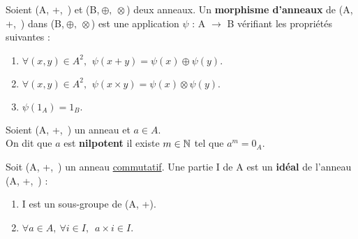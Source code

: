 Soient (A, +,\ \x) et (B,\(\ \oplus ,\ \otimes \)) deux anneaux. Un \textbf{morphisme d'anneaux} de (A, +,\ \x) dans (B,\(\ \oplus ,\ \otimes \)) est une application \(\psi\) : A \(\to\) B vérifiant les propriétés suivantes :\vspace{-0.1cm}
\begin{enumerate}[leftmargin=2cm]
    \item \(\forall(x,y)\in A^2,\ \, \psi(x+y)=\psi(x)\oplus \psi(y). \)\vspace{0.1cm}

    \item \(\forall(x,y)\in A^2,\ \,\psi(x\times y)=\psi(x)\otimes \psi(y). \)\vspace{0.1cm}

    \item \(\psi(1_A)=1_B. \)
\end{enumerate}


\vspace{1cm}

Soient (A, +,\, \x) un anneau et \(a\in A\).\\
On dit que $a$ est \textbf{nilpotent} \ssi il existe $m\in \mathbb{N}$\expo{*} tel que \(a^m=0_A\).

\vspace{1cm}

Soit (A, +,\ \x) un anneau \underline{commutatif}. Une partie I de A est un \textbf{idéal} de l'anneau (A, +,\ \x) \ssi :\vspace{-0.1cm}
\begin{enumerate}[leftmargin=2cm]
    \item I est un sous-groupe de (A, +).\vspace{0.1cm}

    \item \(\forall a\in A,\ \forall i\in I,\ \; a\times i \in I. \)
\end{enumerate}

\vspace{1cm}

